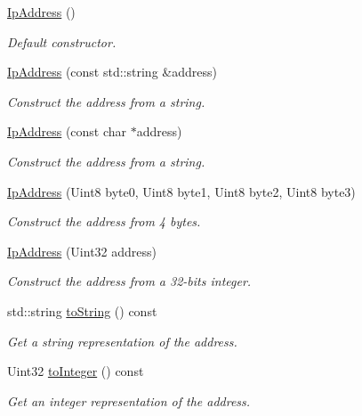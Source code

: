 \begin{DoxyCompactItemize}
\item 
\hyperlink{classsf_1_1_ip_address_af32a0574baa0f46e48deb2d83ca7658b}{Ip\+Address} ()
\begin{DoxyCompactList}\small\item\em Default constructor. \end{DoxyCompactList}\item 
\hyperlink{classsf_1_1_ip_address_a656b7445ab04cabaa7398685bc09c3f7}{Ip\+Address} (const std\+::string \&address)
\begin{DoxyCompactList}\small\item\em Construct the address from a string. \end{DoxyCompactList}\item 
\hyperlink{classsf_1_1_ip_address_a92f2a9be74334a61b96c2fc79fe6eb78}{Ip\+Address} (const char $\ast$address)
\begin{DoxyCompactList}\small\item\em Construct the address from a string. \end{DoxyCompactList}\item 
\hyperlink{classsf_1_1_ip_address_a1d289dcb9ce7a64c600c6f84cba88cc6}{Ip\+Address} (Uint8 byte0, Uint8 byte1, Uint8 byte2, Uint8 byte3)
\begin{DoxyCompactList}\small\item\em Construct the address from 4 bytes. \end{DoxyCompactList}\item 
\hyperlink{classsf_1_1_ip_address_a8ed34ba3a40d70eb9f09ac5ae779a162}{Ip\+Address} (Uint32 address)
\begin{DoxyCompactList}\small\item\em Construct the address from a 32-\/bits integer. \end{DoxyCompactList}\item 
std\+::string \hyperlink{classsf_1_1_ip_address_a88507954142d7fc2176cce7f36422340}{to\+String} () const
\begin{DoxyCompactList}\small\item\em Get a string representation of the address. \end{DoxyCompactList}\item 
Uint32 \hyperlink{classsf_1_1_ip_address_ae7911c5ea9562f9602c3e29cd54b15e9}{to\+Integer} () const
\begin{DoxyCompactList}\small\item\em Get an integer representation of the address. \end{DoxyCompactList}\end{DoxyCompactItemize}
